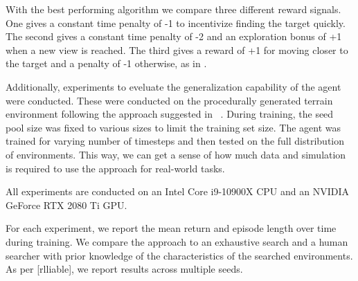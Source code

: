 With the best performing algorithm we compare three different reward signals.
One gives a constant time penalty of -1 to incentivize finding the target quickly.
The second gives a constant time penalty of -2 and an exploration bonus of +1 when a new view is reached.
The third gives a reward of +1 for moving closer to the target and a penalty of -1 otherwise, as in \cite{caicedo_active_2015}.

Additionally, experiments to eveluate the generalization capability of the agent were conducted.
These were conducted on the procedurally generated terrain environment following the approach suggested in ~\cite{procgen}.
During training, the seed pool size was fixed to various sizes to limit the training set size.
The agent was trained for varying number of timesteps and then tested on the full distribution of environments.
This way, we can get a sense of how much data and simulation is required to use the approach for real-world tasks.

All experiments are conducted on an Intel Core i9-10900X CPU and an NVIDIA GeForce RTX 2080 Ti GPU.

For each experiment, we report the mean return and episode length over time during training.
We compare the approach to an exhaustive search and a human searcher with prior knowledge of the characteristics of the searched environments.
As per [rlliable], we report results across multiple seeds.









